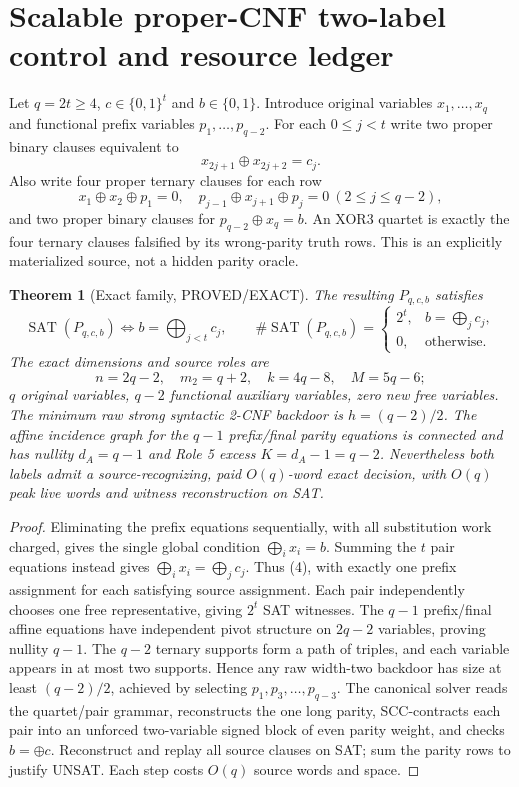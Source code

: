 \documentclass[11pt]{article}
\newtheorem{theorem}{Theorem}
\begin{document}
\section{Scalable proper-CNF two-label control and resource ledger}
Let $q=2t\ge4$, $c\in\{0,1\}^t$ and $b\in\{0,1\}$. Introduce original variables $x_1,\ldots,x_q$ and functional prefix variables $p_1,\ldots,p_{q-2}$. For each $0\le j<t$ write two proper binary clauses equivalent to
\[
x_{2j+1}\oplus x_{2j+2}=c_j.
\tag{2}
\]
Also write four proper ternary clauses for each row
\[
x_1\oplus x_2\oplus p_1=0,\quad
p_{j-1}\oplus x_{j+1}\oplus p_j=0\ (2\le j\le q-2),
\tag{3}
\]
and two proper binary clauses for $p_{q-2}\oplus x_q=b$. An XOR3 quartet is exactly the four ternary clauses falsified by its wrong-parity truth rows. This is an explicitly materialized source, not a hidden parity oracle.

\begin{theorem}[Exact family, PROVED/EXACT]
The resulting $P_{q,c,b}$ satisfies
\[
\operatorname{SAT}(P_{q,c,b})\iff b=\bigoplus_{j<t}c_j,\qquad
\#\operatorname{SAT}(P_{q,c,b})=
\begin{cases}2^t,&b=\bigoplus_jc_j,\\0,&\text{otherwise.}\end{cases}
\tag{4}
\]
The exact dimensions and source roles are
\[
n=2q-2,\quad m_2=q+2,\quad k=4q-8,\quad M=5q-6;
\tag{5}
\]
$q$ original variables, $q-2$ functional auxiliary variables, zero new free variables. The minimum raw strong syntactic 2-CNF backdoor is $h=(q-2)/2$. The affine incidence graph for the $q-1$ prefix/final parity equations is connected and has nullity $d_A=q-1$ and Role 5 excess $K=d_A-1=q-2$. Nevertheless both labels admit a source-recognizing, paid $O(q)$-word exact decision, with $O(q)$ peak live words and witness reconstruction on SAT.
\end{theorem}
\begin{proof}
Eliminating the prefix equations sequentially, with all substitution work charged, gives the single global condition $\bigoplus_i x_i=b$. Summing the $t$ pair equations instead gives $\bigoplus_i x_i=\bigoplus_jc_j$. Thus (4), with exactly one prefix assignment for each satisfying source assignment. Each pair independently chooses one free representative, giving $2^t$ SAT witnesses. The $q-1$ prefix/final affine equations have independent pivot structure on $2q-2$ variables, proving nullity $q-1$. The $q-2$ ternary supports form a path of triples, and each variable appears in at most two supports. Hence any raw width-two backdoor has size at least $(q-2)/2$, achieved by selecting $p_1,p_3,\ldots,p_{q-3}$. The canonical solver reads the quartet/pair grammar, reconstructs the one long parity, SCC-contracts each pair into an unforced two-variable signed block of even parity weight, and checks $b=\oplus c$. Reconstruct and replay all source clauses on SAT; sum the parity rows to justify UNSAT. Each step costs $O(q)$ source words and space.
\end{proof}
\end{document}
